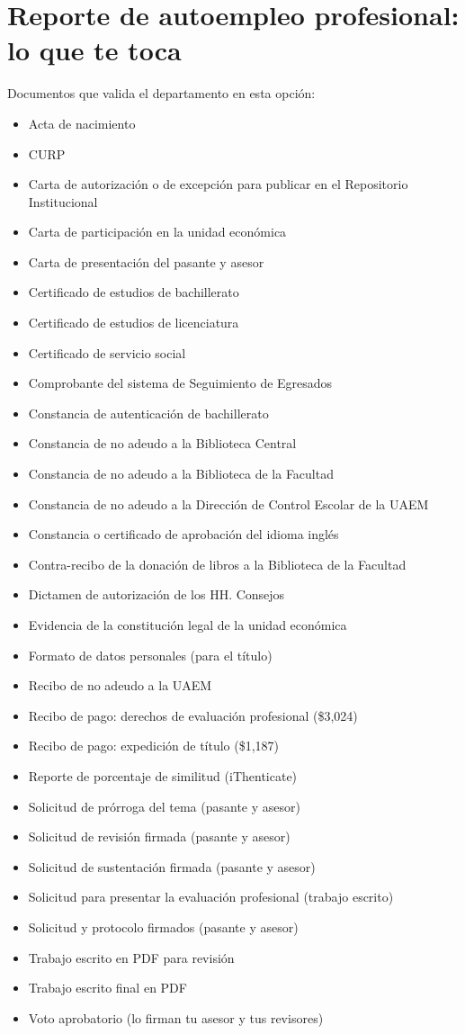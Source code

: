 \section{Reporte de autoempleo profesional: lo que te toca}
Documentos que valida el departamento en esta opción:
\begin{itemize}
  \item Acta de nacimiento
  \item CURP
  \item Carta de autorización o de excepción para publicar en el Repositorio Institucional
  \item Carta de participación en la unidad económica
  \item Carta de presentación del pasante y asesor
  \item Certificado de estudios de bachillerato
  \item Certificado de estudios de licenciatura
  \item Certificado de servicio social
  \item Comprobante del sistema de Seguimiento de Egresados
  \item Constancia de autenticación de bachillerato
  \item Constancia de no adeudo a la Biblioteca Central
  \item Constancia de no adeudo a la Biblioteca de la Facultad
  \item Constancia de no adeudo a la Dirección de Control Escolar de la UAEM
  \item Constancia o certificado de aprobación del idioma inglés
  \item Contra-recibo de la donación de libros a la Biblioteca de la Facultad
  \item Dictamen de autorización de los HH. Consejos
  \item Evidencia de la constitución legal de la unidad económica
  \item Formato de datos personales (para el título)
  \item Recibo de no adeudo a la UAEM
  \item Recibo de pago: derechos de evaluación profesional (\$3,024)
  \item Recibo de pago: expedición de título (\$1,187)
  \item Reporte de porcentaje de similitud (iThenticate)
  \item Solicitud de prórroga del tema (pasante y asesor)
  \item Solicitud de revisión firmada (pasante y asesor)
  \item Solicitud de sustentación firmada (pasante y asesor)
  \item Solicitud para presentar la evaluación profesional (trabajo escrito)
  \item Solicitud y protocolo firmados (pasante y asesor)
  \item Trabajo escrito en PDF para revisión
  \item Trabajo escrito final en PDF
  \item Voto aprobatorio (lo firman tu asesor y tus revisores)
\end{itemize}
